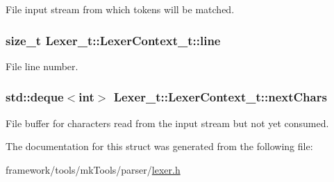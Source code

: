 File input stream from which tokens will be matched. 

\subsubsection[{\texorpdfstring{line}{line}}]{\setlength{\rightskip}{0pt plus 5cm}size\+\_\+t Lexer\+\_\+t\+::\+Lexer\+Context\+\_\+t\+::line}\hypertarget{struct_lexer__t_1_1_lexer_context__t_a4543fbb02e7a61383a9102f4703a522a}{}\label{struct_lexer__t_1_1_lexer_context__t_a4543fbb02e7a61383a9102f4703a522a}


File line number. 

\subsubsection[{\texorpdfstring{next\+Chars}{nextChars}}]{\setlength{\rightskip}{0pt plus 5cm}std\+::deque$<$int$>$ Lexer\+\_\+t\+::\+Lexer\+Context\+\_\+t\+::next\+Chars}\hypertarget{struct_lexer__t_1_1_lexer_context__t_af1d6222b4de2bc9f85c35a4aadd84118}{}\label{struct_lexer__t_1_1_lexer_context__t_af1d6222b4de2bc9f85c35a4aadd84118}
File buffer for characters read from the input stream but not yet consumed. 

The documentation for this struct was generated from the following file\+:\begin{DoxyCompactItemize}
\item 
framework/tools/mk\+Tools/parser/\hyperlink{lexer_8h}{lexer.\+h}\end{DoxyCompactItemize}
